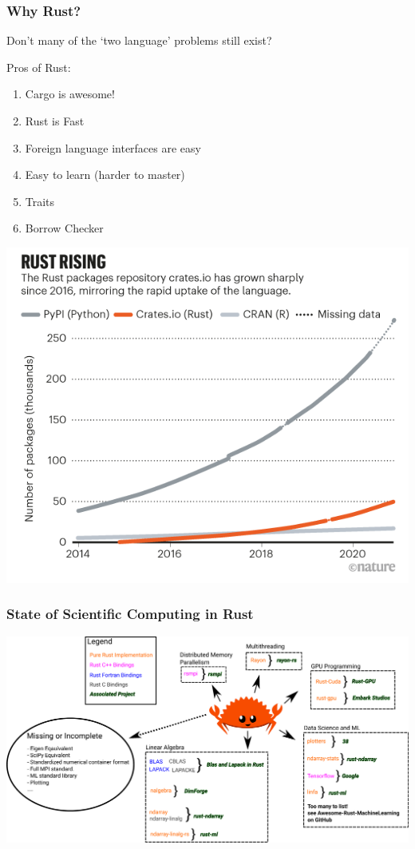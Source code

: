 \begin{frame}
    \frametitle{Why Rust?}
    Don't many of the `two language' problems still exist?

    \vline

    Pros of Rust:

    \begin{enumerate}
        \item Cargo is awesome!
        \item Rust is Fast
        \item Foreign language interfaces are easy
        \item Easy to learn (harder to master)
        \item Traits
        \item Borrow Checker
    \end{enumerate}

\end{frame}

\begin{frame}
    \includegraphics[width=0.95\linewidth]{assets/rust_rising.png}
\end{frame}


\begin{frame}
    \frametitle{State of Scientific Computing in Rust}
    \includegraphics[width=0.95\linewidth]{assets/state_of_rust.pdf}
\end{frame}

